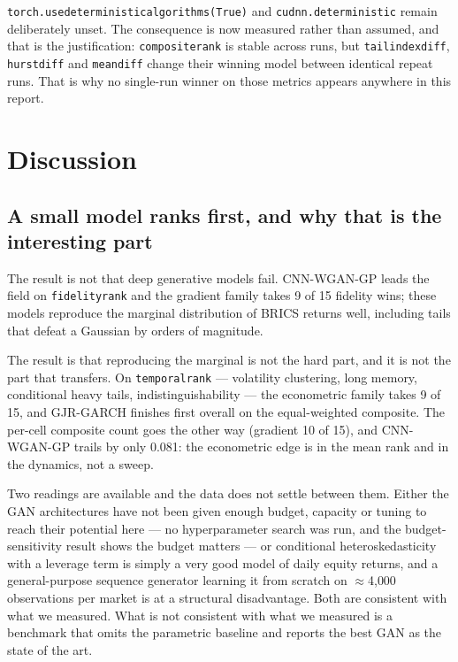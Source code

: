\documentclass[11pt,a4paper]{article}
\makeatletter
\DeclareRobustCommand{\_}{\ifmmode\nfss@text{\textunderscore}\else\textunderscore\allowbreak\fi}
\makeatother
\begin{document}
\texttt{torch.use\_deterministic\_algorithms(True)} and \texttt{cudnn.deterministic} remain deliberately unset. The consequence is now measured rather than assumed, and that is the justification: \texttt{composite\_rank} is stable across runs, but \texttt{tail\_index\_diff}, \texttt{hurst\_diff} and \texttt{mean\_diff} change their winning model between identical repeat runs. That is why no single-run winner on those metrics appears anywhere in this report.
\section{Discussion}
\label{sec:discussion}

\subsection{A small model ranks first, and why that is the interesting part}
The result is not that deep generative models fail. CNN-WGAN-GP leads the field on \texttt{fidelity\_rank} and the gradient family takes 9 of 15 fidelity wins; these models reproduce the marginal distribution of BRICS returns well, including tails that defeat a Gaussian by orders of magnitude.

The result is that reproducing the marginal is not the hard part, and it is not the part that transfers. On \texttt{temporal\_rank} --- volatility clustering, long memory, conditional heavy tails, indistinguishability --- the econometric family takes 9 of 15, and GJR-GARCH finishes first overall on the equal-weighted composite. The per-cell composite count goes the other way (gradient 10 of 15), and CNN-WGAN-GP trails by only 0.081: the econometric edge is in the mean rank and in the dynamics, not a sweep.

Two readings are available and the data does not settle between them. Either the GAN architectures have not been given enough budget, capacity or tuning to reach their potential here --- no hyperparameter search was run, and the budget-sensitivity result shows the budget matters --- or conditional heteroskedasticity with a leverage term is simply a very good model of daily equity returns, and a general-purpose sequence generator learning it from scratch on $\approx$4{,}000 observations per market is at a structural disadvantage. Both are consistent with what we measured. What is not consistent with what we measured is a benchmark that omits the parametric baseline and reports the best GAN as the state of the art.
\end{document}
